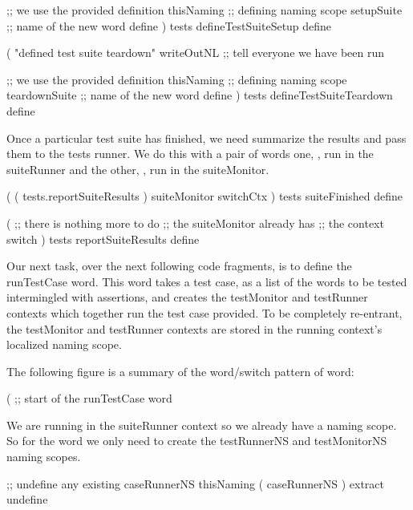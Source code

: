               ;; we use the provided definition
  thisNaming  ;; defining naming scope
  setupSuite  ;; name of the new word
  define
)
tests
defineTestSuiteSetup
define
\stopJoylolCode

\startJoylolCode
(
  "defined test suite teardown"
  writeOutNL    ;; tell everyone we have been run

                ;; we use the provided definition
  thisNaming    ;; defining naming scope
  teardownSuite ;; name of the new word
  define
)
tests
defineTestSuiteTeardown
define
\stopJoylolCode

Once a particular test suite has finished, we need summarize the results 
and pass them to the tests runner. We do this with a pair of words one, 
, run in the suiteRunner and the other, 
, run in the suiteMonitor. 

\startJoylolCode
(
  ( tests.reportSuiteResults )
  suiteMonitor
  switchCtx
)
tests
suiteFinished
define
\stopJoylolCode

\startJoylolCode
(
          ;; there is nothing more to do
          ;; the suiteMonitor already has
          ;; the context switch 
)
tests
reportSuiteResults
define
\stopJoylolCode

\stopTestSuite

\startTestSuite[runTestCase]

Our next task, over the next following code fragments, is to define the 
runTestCase word. This word takes a test case, as a list of the words to 
be tested intermingled with assertions, and creates the testMonitor and 
testRunner contexts which together run the test case provided. To be 
completely re-entrant, the testMonitor and testRunner contexts are stored 
in the running context's localized naming scope. 

The following figure is a summary of the word/switch pattern of 
 word: 


\startJoylolCode
(               ;; start of the runTestCase word
\stopJoylolCode

We are running in the suiteRunner context so we already have a 
 naming scope. So for the  word we only 
need to create the testRunnerNS and testMonitorNS naming scopes. 

\startJoylolCode
  ;; undefine any existing caseRunnerNS
  thisNaming
  ( caseRunnerNS ) extract
  undefine

